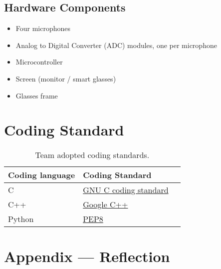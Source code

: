 \documentclass{article}
\begin{document}
\subsection{Hardware Components}
\begin{itemize}
  \item Four microphones
  \item Analog to Digital Converter (ADC) modules, one per microphone
  \item Microcontroller
  \item Screen (monitor / smart glasses)
  \item Glasses frame
\end{itemize}


\section{Coding Standard}\label{sec:coding_standards}

\begin{table}[h!]
\centering
\begin{tabularx}{\textwidth}{|l|X|X|}
\hline
\textbf{Coding language} & \textbf{Coding Standard} \\ \hline
C & \href{https://www.gnu.org/prep/standards/html_node/Writing-C.html}{GNU C coding standard} \\ \hline
C++ & \href{https://google.github.io/styleguide/cppguide.html}{Google C++} \\ \hline
Python & \href{https://peps.python.org/pep-0008/}{PEP8} \\ \hline
\end{tabularx}
\caption{Team adopted coding standards.}
\end{table}

\newpage{}

\section*{Appendix --- Reflection}


\end{document}
